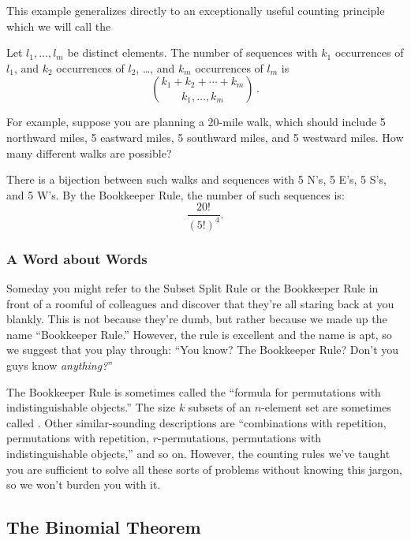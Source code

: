 This example generalizes directly to an exceptionally useful counting
principle which we will call the
\begin{rul}
Let $l_1, \ldots, l_m$ be distinct elements.  The number of sequences with
$k_1$ occurrences of $l_1$, and $k_2$ occurrences of $l_2$, \dots, and
$k_m$ occurrences of $l_m$ is
\[
\binom{k_1 + k_2 + \cdots + k_m}{k_1,\dots,k_m}\,.
\]
\end{rul}

For example, suppose you are planning a 20-mile walk, which should
include 5 northward miles, 5 eastward miles, 5 southward miles, and 5
westward miles.  How many different walks are possible?

There is a bijection between such walks and sequences with 5 N's, 5
E's, 5 S's, and 5 W's.  By the Bookkeeper Rule, the number of such
sequences is:
\[
    \frac{20!}{(5!)^4}.
\]

\subsubsection{A Word about Words}

Someday you might refer to the Subset Split Rule or the Bookkeeper Rule
in front of a roomful of colleagues and discover that they're all staring
back at you blankly.  This is not because they're dumb, but rather because
we made up the name ``Bookkeeper Rule.''  However, the rule is excellent
and the name is apt, so we suggest that you play through: ``You know?  The
Bookkeeper Rule?  Don't you guys know \emph{anything?}''

The Bookkeeper Rule is sometimes called the ``formula for permutations
with indistinguishable objects.''  The size $k$ subsets of an $n$-element
set are sometimes called .  Other similar-sounding
descriptions are ``combinations with repetition, permutations with
repetition, $r$-permutations, permutations with indistinguishable
objects,'' and so on.  However, the counting rules we've taught you are
sufficient to solve all these sorts of problems without knowing this
jargon, so we won't burden you with it.

\begin{problems}
\classproblems
{}
\end{problems}


\subsection{The Binomial Theorem}\label{binomial_theorem_sec}

